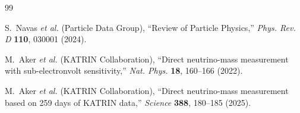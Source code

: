 \documentclass[12pt,a4paper]{article}
\begin{document}
\begin{thebibliography}{99}

S.~Navas \textit{et al.} (Particle Data Group), ``Review of Particle Physics,'' \textit{Phys. Rev. D} \textbf{110}, 030001 (2024).

M.~Aker \textit{et al.} (KATRIN Collaboration), ``Direct neutrino-mass measurement with sub-electronvolt sensitivity,'' \textit{Nat. Phys.} \textbf{18}, 160--166 (2022).

M.~Aker \textit{et al.} (KATRIN Collaboration), ``Direct neutrino-mass measurement based on 259 days of KATRIN data,'' \textit{Science} \textbf{388}, 180--185 (2025).

\end{thebibliography}
\end{document}
